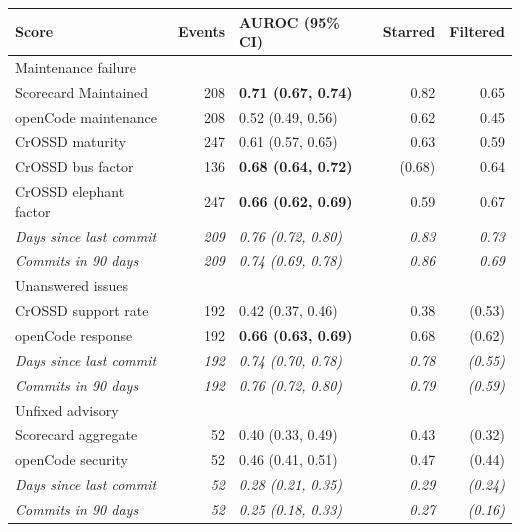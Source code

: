 \begin{tabular}{lrlrr}
\toprule
Score & Events & AUROC (95\% CI) & Starred & Filtered \\
\midrule
\multicolumn{5}{l}{Maintenance failure} \\
Scorecard Maintained & 208 & \textbf{0.71 (0.67, 0.74)} & 0.82 & 0.65 \\
openCode maintenance & 208 & 0.52 (0.49, 0.56) & 0.62 & 0.45 \\
CrOSSD maturity & 247 & 0.61 (0.57, 0.65) & 0.63 & 0.59 \\
CrOSSD bus factor & 136 & \textbf{0.68 (0.64, 0.72)} & (0.68) & 0.64 \\
CrOSSD elephant factor & 247 & \textbf{0.66 (0.62, 0.69)} & 0.59 & 0.67 \\
\quad\textit{Days since last commit} & \textit{209} & \textit{0.76 (0.72, 0.80)} & \textit{0.83} & \textit{0.73} \\
\quad\textit{Commits in 90 days} & \textit{209} & \textit{0.74 (0.69, 0.78)} & \textit{0.86} & \textit{0.69} \\
\midrule
\multicolumn{5}{l}{Unanswered issues} \\
CrOSSD support rate & 192 & 0.42 (0.37, 0.46) & 0.38 & (0.53) \\
openCode response & 192 & \textbf{0.66 (0.63, 0.69)} & 0.68 & (0.62) \\
\quad\textit{Days since last commit} & \textit{192} & \textit{0.74 (0.70, 0.78)} & \textit{0.78} & \textit{(0.55)} \\
\quad\textit{Commits in 90 days} & \textit{192} & \textit{0.76 (0.72, 0.80)} & \textit{0.79} & \textit{(0.59)} \\
\midrule
\multicolumn{5}{l}{Unfixed advisory} \\
Scorecard aggregate & 52 & 0.40 (0.33, 0.49) & 0.43 & (0.32) \\
openCode security & 52 & 0.46 (0.41, 0.51) & 0.47 & (0.44) \\
\quad\textit{Days since last commit} & \textit{52} & \textit{0.28 (0.21, 0.35)} & \textit{0.29} & \textit{(0.24)} \\
\quad\textit{Commits in 90 days} & \textit{52} & \textit{0.25 (0.18, 0.33)} & \textit{0.27} & \textit{(0.16)} \\
\bottomrule
\end{tabular}

